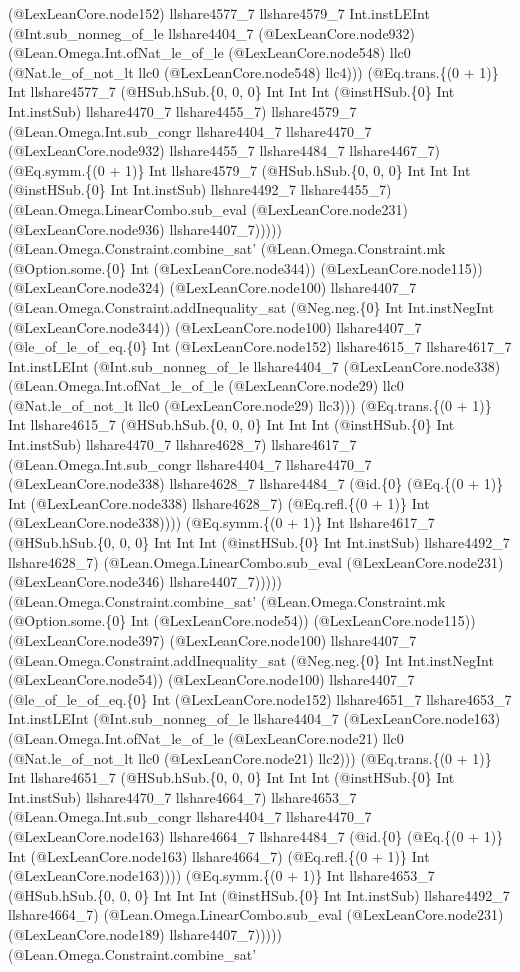 \documentclass[11pt]{article}
\begin{document}
(@LexLeanCore.node152) llshare4577\_7 llshare4579\_7 Int.instLEInt (@Int.sub\_nonneg\_of\_le llshare4404\_7 (@LexLeanCore.node932) (@Lean.Omega.Int.ofNat\_le\_of\_le (@LexLeanCore.node548) llc0 (@Nat.le\_of\_not\_lt llc0 (@LexLeanCore.node548) llc4))) (@Eq.trans.\{(0 + 1)\} Int llshare4577\_7 (@HSub.hSub.\{0, 0, 0\} Int Int Int (@instHSub.\{0\} Int Int.instSub) llshare4470\_7 llshare4455\_7) llshare4579\_7 (@Lean.Omega.Int.sub\_congr llshare4404\_7 llshare4470\_7 (@LexLeanCore.node932) llshare4455\_7 llshare4484\_7 llshare4467\_7) (@Eq.symm.\{(0 + 1)\} Int llshare4579\_7 (@HSub.hSub.\{0, 0, 0\} Int Int Int (@instHSub.\{0\} Int Int.instSub) llshare4492\_7 llshare4455\_7) (@Lean.Omega.LinearCombo.sub\_eval (@LexLeanCore.node231) (@LexLeanCore.node936) llshare4407\_7))))) (@Lean.Omega.Constraint.combine\_sat' (@Lean.Omega.Constraint.mk (@Option.some.\{0\} Int (@LexLeanCore.node344)) (@LexLeanCore.node115)) (@LexLeanCore.node324) (@LexLeanCore.node100) llshare4407\_7 (@Lean.Omega.Constraint.addInequality\_sat (@Neg.neg.\{0\} Int Int.instNegInt (@LexLeanCore.node344)) (@LexLeanCore.node100) llshare4407\_7 (@le\_of\_le\_of\_eq.\{0\} Int (@LexLeanCore.node152) llshare4615\_7 llshare4617\_7 Int.instLEInt (@Int.sub\_nonneg\_of\_le llshare4404\_7 (@LexLeanCore.node338) (@Lean.Omega.Int.ofNat\_le\_of\_le (@LexLeanCore.node29) llc0 (@Nat.le\_of\_not\_lt llc0 (@LexLeanCore.node29) llc3))) (@Eq.trans.\{(0 + 1)\} Int llshare4615\_7 (@HSub.hSub.\{0, 0, 0\} Int Int Int (@instHSub.\{0\} Int Int.instSub) llshare4470\_7 llshare4628\_7) llshare4617\_7 (@Lean.Omega.Int.sub\_congr llshare4404\_7 llshare4470\_7 (@LexLeanCore.node338) llshare4628\_7 llshare4484\_7 (@id.\{0\} (@Eq.\{(0 + 1)\} Int (@LexLeanCore.node338) llshare4628\_7) (@Eq.refl.\{(0 + 1)\} Int (@LexLeanCore.node338)))) (@Eq.symm.\{(0 + 1)\} Int llshare4617\_7 (@HSub.hSub.\{0, 0, 0\} Int Int Int (@instHSub.\{0\} Int Int.instSub) llshare4492\_7 llshare4628\_7) (@Lean.Omega.LinearCombo.sub\_eval (@LexLeanCore.node231) (@LexLeanCore.node346) llshare4407\_7))))) (@Lean.Omega.Constraint.combine\_sat' (@Lean.Omega.Constraint.mk (@Option.some.\{0\} Int (@LexLeanCore.node54)) (@LexLeanCore.node115)) (@LexLeanCore.node397) (@LexLeanCore.node100) llshare4407\_7 (@Lean.Omega.Constraint.addInequality\_sat (@Neg.neg.\{0\} Int Int.instNegInt (@LexLeanCore.node54)) (@LexLeanCore.node100) llshare4407\_7 (@le\_of\_le\_of\_eq.\{0\} Int (@LexLeanCore.node152) llshare4651\_7 llshare4653\_7 Int.instLEInt (@Int.sub\_nonneg\_of\_le llshare4404\_7 (@LexLeanCore.node163) (@Lean.Omega.Int.ofNat\_le\_of\_le (@LexLeanCore.node21) llc0 (@Nat.le\_of\_not\_lt llc0 (@LexLeanCore.node21) llc2))) (@Eq.trans.\{(0 + 1)\} Int llshare4651\_7 (@HSub.hSub.\{0, 0, 0\} Int Int Int (@instHSub.\{0\} Int Int.instSub) llshare4470\_7 llshare4664\_7) llshare4653\_7 (@Lean.Omega.Int.sub\_congr llshare4404\_7 llshare4470\_7 (@LexLeanCore.node163) llshare4664\_7 llshare4484\_7 (@id.\{0\} (@Eq.\{(0 + 1)\} Int (@LexLeanCore.node163) llshare4664\_7) (@Eq.refl.\{(0 + 1)\} Int (@LexLeanCore.node163)))) (@Eq.symm.\{(0 + 1)\} Int llshare4653\_7 (@HSub.hSub.\{0, 0, 0\} Int Int Int (@instHSub.\{0\} Int Int.instSub) llshare4492\_7 llshare4664\_7) (@Lean.Omega.LinearCombo.sub\_eval (@LexLeanCore.node231) (@LexLeanCore.node189) llshare4407\_7))))) (@Lean.Omega.Constraint.combine\_sat' 
\end{document}
